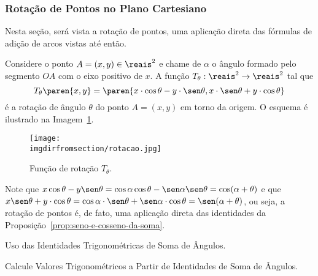 \subsubsection{Rotação de Pontos no Plano Cartesiano}

Nesta seção, será vista a rotação de pontos, uma aplicação direta das fórmulas de adição de arcos vistas até então.

\begin{definition}
Considere o ponto $A = (x, y) \in \reais^2$ e chame de $\alpha$ o ângulo
formado pelo segmento $OA$ com o eixo positivo de $x$. A função
$T_{\theta} : \reais^2 \to \reais^2$  tal que
$$T_{\theta}\paren{x, y} = \paren{x\cdot \cos \theta - y\cdot \sen \theta, x\cdot \sen \theta + y\cdot \cos
\theta}$$ é a rotação de ângulo $\theta$ do ponto $A = (x,y)$ em
torno da origem. O esquema é ilustrado na Imagem~\ref{img:funcao-rotacao}.
%
\begin{figure}[H]
\centering
\texttt{[image: \\imgdirfromsection/rotacao.jpg]}
\caption{Função de rotação $T_{\theta}$.}
\label{img:funcao-rotacao}
\end{figure}
\end{definition}

\begin{remark}
    Note que $x\cos \theta - y\sen\theta = \cos\alpha\cos\theta - \sen\alpha\sen\theta = \cos(\alpha+\theta)$ e que 
    $x \sen \theta + y\cdot \cos \theta = \cos\alpha \cdot \sen\theta + \sen\alpha \cdot \cos\theta = \sen(\alpha+\theta)$, 
    ou seja, a rotação de pontos é, de fato, uma aplicação direta das identidades da Proposição~\ref{prop:seno-e-cosseno-da-soma}.
\end{remark}

\begin{onlineact}
    {Uso das Identidades Trigonométricas de Soma de Ângulos}.
\end{onlineact}

\begin{onlineact}
    {Calcule Valores Trigonométricos a Partir de Identidades de Soma de Ângulos}.
\end{onlineact}